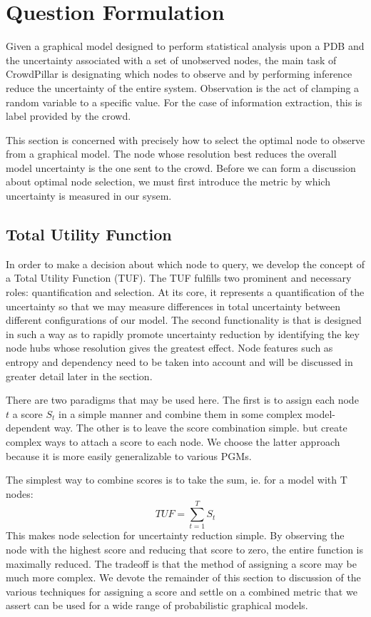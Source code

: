 \section{Question Formulation}
Given a graphical model designed to perform statistical analysis upon a PDB and the uncertainty associated with a set of unobserved nodes, the main task of CrowdPillar is designating which nodes to observe and by performing inference reduce the uncertainty of the entire system.  Observation is the act of clamping a random variable to a specific value.  For the case of information extraction, this is label provided by the crowd.

This section is concerned with precisely how to select the optimal node to observe from a graphical model.  The node whose resolution best reduces the overall model uncertainty is the one sent to the crowd.  Before we can form a discussion about optimal node selection, we must first introduce the metric by which uncertainty is measured in our sysem.

\subsection{Total Utility Function}
In order to make a decision about which node to query, we develop the concept of a Total Utility Function (TUF). The TUF fulfills two prominent and necessary roles: quantification and selection.  At its core, it represents a quantification of the uncertainty so that we may measure differences in total uncertainty between different configurations of our model.  The second functionality is that is designed in such a way as to rapidly promote uncertainty reduction by identifying the key node hubs whose resolution gives the greatest effect.  Node features such as entropy and dependency need to be taken into account and will be discussed in greater detail later in the section. 

There are two paradigms that may be used here.  The first is to assign each node $t$ a score $S_{t}$ in a simple manner and combine them in some complex model-dependent way.  The other is to leave the score combination simple. but create complex ways to attach a score to each node.  We choose the latter approach because it is more easily generalizable to various PGMs.

The simplest way to combine scores is to take the sum, ie. for a model with T nodes:
\begin{equation}
TUF = \sum_{t=1}^{T}S_{t}
\end{equation}
This makes node selection for uncertainty reduction simple.  By observing the node with the highest score and reducing that score to zero, the entire function is maximally reduced.  The tradeoff is that the method of assigning a score may be much more complex.  We devote the remainder of this section to discussion of the various techniques for assigning a score and settle on a combined metric that we assert can be used for a wide range of probabilistic graphical models.

